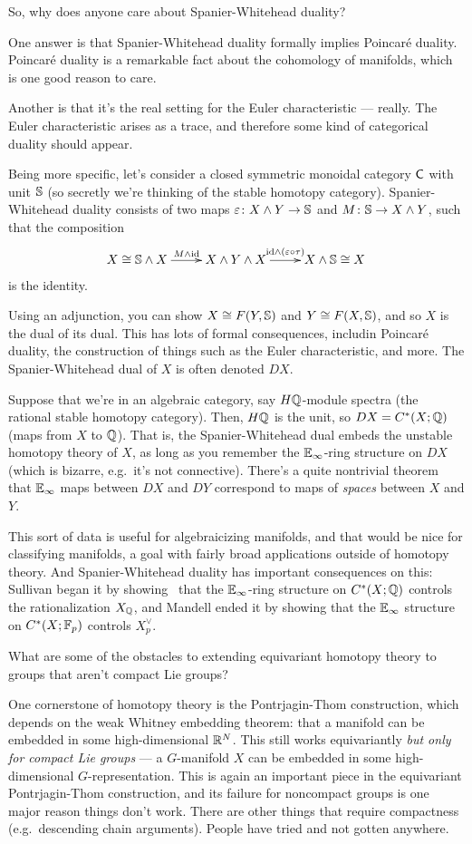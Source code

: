 \begin{ques}
So, why does anyone care about Spanier-Whitehead duality?
\end{ques}
One answer is that Spanier-Whitehead duality formally implies Poincaré duality. Poincaré duality is a remarkable
fact about the cohomology of manifolds, which is one good reason to care.

Another is that it's the real setting for the Euler characteristic --- really. The Euler characteristic arises as a
trace, and therefore some kind of categorical duality should appear.

Being more specific, let's consider a closed symmetric monoidal category $\mathsf C$ with unit $\mathbb S$ (so secretly we're
thinking of the stable homotopy category). Spanier-Whitehead duality consists of two maps $\varepsilon\colon X\wedge
Y\to\mathbb S$ and $M\colon \mathbb S\to X\wedge Y$, such that the composition
\[\xymatrix{
	X\cong \Sph\wedge X\ar[r]^{M\wedge\id} & X\wedge Y\wedge X\ar[r]^{\id\wedge(\e\circ\tau)} &X\wedge\Sph\cong X
}\]
is the identity.

Using an adjunction, you can show $X\cong F(Y,\mathbb S)$ and $Y\cong F(X,\mathbb S)$, and so $X$ is the dual of its dual.
This has lots of formal consequences, includin Poincaré duality, the construction of things such as the Euler
characteristic, and more. The Spanier-Whitehead dual of $X$ is often denoted $DX$.

Suppose that we're in an algebraic category, say $H\mathbb Q$-module spectra (the rational stable homotopy category).
Then, $H\mathbb Q$ is the unit, so $DX = C^*(X;\mathbb Q)$ (maps from $X$ to $\mathbb Q$). That is, the Spanier-Whitehead dual embeds
the unstable homotopy theory of $X$, as long as you remember the $\mathbb E_\infty$-ring structure on $DX$ (which is
bizarre, e.g.\ it's not connective). There's a quite nontrivial theorem that $\mathbb E_\infty$ maps between $DX$ and $DY$
correspond to maps of \emph{spaces} between $X$ and $Y$.

This sort of data is useful for algebraicizing manifolds, and that would be nice for classifying manifolds, a goal
with fairly broad applications outside of homotopy theory. And Spanier-Whitehead duality has important consequences
on this: Sullivan began it by showing~\cite{SullivanQHT} that the $\mathbb E_\infty$-ring structure on $C^*(X;\mathbb Q)$
controls the rationalization $X_\mathbb Q$, and Mandell ended it by showing that the $\mathbb E_\infty$ structure on
$C^*(X;\mathbb F_p)$ controls $X_p^\lor$.
\begin{ques}
What are some of the obstacles to extending equivariant homotopy theory to groups that aren't compact Lie groups?
\end{ques}
One cornerstone of homotopy theory is the Pontrjagin-Thom construction, which depends on the weak Whitney embedding
theorem: that a manifold can be embedded in some high-dimensional $\mathbb R^N$. This still works equivariantly \emph{but
only for compact Lie groups} --- a $G$-manifold $X$ can be embedded in some high-dimensional $G$-representation.
This is again an important piece in the equivariant Pontrjagin-Thom construction, and its failure for noncompact
groups is one major reason things don't work. There are other things that require compactness (e.g.\ descending
chain arguments). People have tried and not gotten anywhere.

